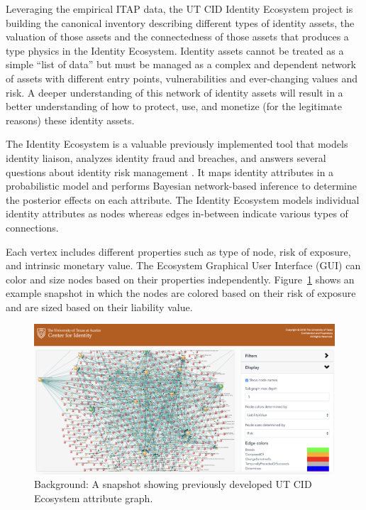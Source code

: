 \documentclass[conference]{IEEEtran}
\begin{document}
Leveraging the empirical ITAP data, the UT CID Identity Ecosystem project is building the canonical inventory describing different types of identity assets, the valuation of those assets and the connectedness of those assets that produces a type physics in the Identity Ecosystem. Identity assets cannot be treated as a simple ``list of data'' but must be managed as a complex and dependent network of assets with different entry points, vulnerabilities and ever-changing values and risk. A deeper understanding of this network of identity assets will result in a better understanding of how to protect, use, and monetize (for the legitimate reasons) these identity assets.

The Identity Ecosystem is a valuable previously implemented tool that models identity liaison, analyzes identity fraud and breaches, and answers several questions about identity risk management \cite{EcosystemModeling}. It maps identity attributes in a probabilistic model and performs Bayesian network-based inference to determine the posterior effects on each attribute. The Identity Ecosystem models individual identity attributes as nodes whereas edges in-between indicate various types of connections.
 
Each vertex includes different properties such as type of node, risk of exposure, and intrinsic monetary value. The Ecosystem Graphical User Interface (GUI) can color and size nodes based on their properties independently. Figure~\ref{fig:ecosystem_whole} shows an example snapshot in which the nodes are colored based on their risk of exposure and are sized based on their liability value.

\begin{figure}[ht]
  \includegraphics[width=\linewidth]{ecosystem_snapshot.png}
  \caption{Background: A snapshot showing previously developed  UT CID Ecosystem attribute graph.}
  \label{fig:ecosystem_whole}
\end{figure}
\end{document}
